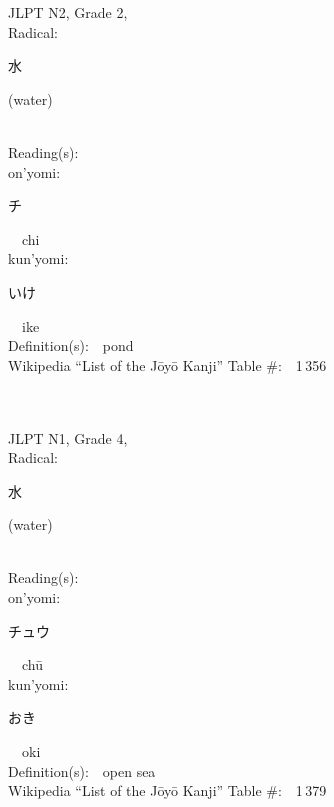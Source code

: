 \begin{multicols}{2}
{JLPT N2, Grade 2, \\Radical:\ \ {\begin{CJK}{UTF8}{min} 水 \end{CJK}} (water) } \\
Reading(s):\ \ \\
{\hspace*{1em}}on'yomi:\ \ \\
{\hspace*{2em}}{\begin{CJK}{UTF8}{min} チ \end{CJK}}\ \ chi\ \ \\
{\hspace*{1em}}kun'yomi:\ \ \\
{\hspace*{2em}}{\begin{CJK}{UTF8}{min} いけ \end{CJK}}\ \ ike\ \ \\
Definition(s):\ \ pond \\
Wikipedia ``List of the J\=oy\=o Kanji'' Table \#:\ \ 1\,356 \\
\ \ \\
{\fontsize{34pt}{40pt}  }\ \ \\  %
{JLPT N1, Grade 4, \\Radical:\ \ {\begin{CJK}{UTF8}{min} 水 \end{CJK}} (water) } \\
Reading(s):\ \ \\
{\hspace*{1em}}on'yomi:\ \ \\
{\hspace*{2em}}{\begin{CJK}{UTF8}{min} チュウ \end{CJK}}\ \ ch\=u\ \ \\
{\hspace*{1em}}kun'yomi:\ \ \\
{\hspace*{2em}}{\begin{CJK}{UTF8}{min} おき \end{CJK}}\ \ oki\ \ \\
Definition(s):\ \ open sea \\
Wikipedia ``List of the J\=oy\=o Kanji'' Table \#:\ \ 1\,379 \\

\end{multicols}

